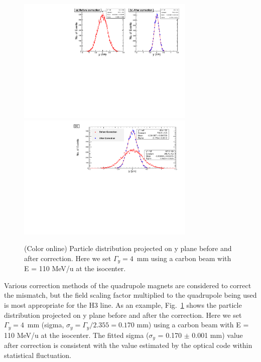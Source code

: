 \documentclass[jkps,preprint,fleqn,showpacs,showkeys]{revtex4}
\begin{document}
\begin{figure}[h]
  \begin{center}
    \includegraphics[width=8.5cm]{Fig08-1.pdf}
    \includegraphics[width=8.5cm]{Fig08-2.pdf}        
    \caption{(Color online) Particle distribution projected on y plane before and after correction.
      Here we set $\Gamma_{y} = 4$~mm using a carbon beam with E = 110 MeV/u at the isocenter.}
    \label{fig7}
  \end{center}
\end{figure}
Various correction methods of the quadrupole magnets are considered to correct the mismatch,
but the field scaling factor multiplied to the quadrupole being used is most appropriate for the H3 line.
As an example, Fig.~\ref{fig7} shows the particle distribution projected on y plane before and after the correction.
Here we set $\Gamma_{y} = 4$~mm (sigma, $\sigma_{y} = \Gamma_{y}/2.355 = 0.170$ mm) using a carbon beam with E = 110 MeV/u at the isocenter.
The fitted sigma ($\sigma_{y}$ = 0.170 $\pm$ 0.001 mm) value after correction is consistent with the value estimated by the optical code within statistical fluctuation.
\end{document}
